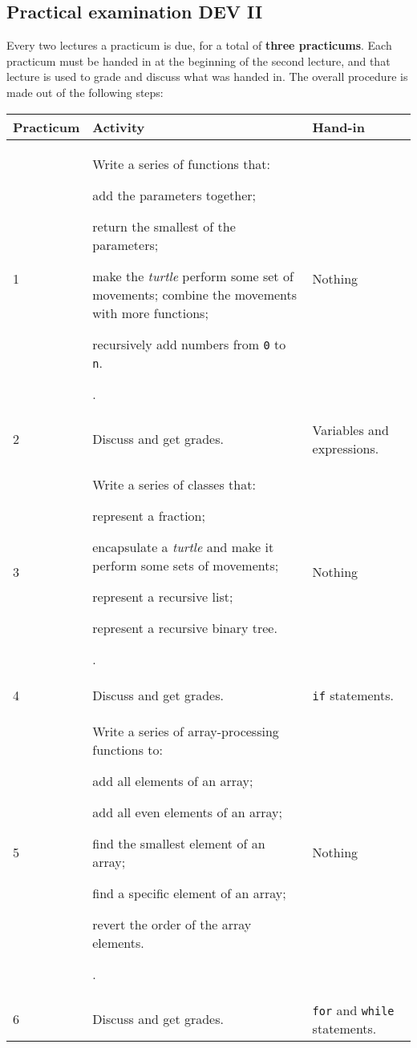 \subsection{Practical examination DEV II}
Every two lectures a practicum is due, for a total of \textbf{three practicums}. Each practicum must be handed in at the beginning of the second lecture, and that lecture is used to grade and discuss what was handed in. The overall procedure is made out of the following steps:

\begin{tabular}{| l | p{8cm} | p{4cm} |}
\hline
\textbf{Practicum} & \textbf{Activity} & \textbf{Hand-in} \\
\hline
1 & Write a series of functions that: 
\begin{inparaenum}
\item add the parameters together;
\item return the smallest of the parameters;
\item make the \textit{turtle} perform some set of movements; combine the movements with more functions;
\item recursively add numbers from \texttt{0} to \texttt{n}.
\end{inparaenum}. & Nothing \\
\hline
2 & Discuss and get grades. & Variables and expressions. \\
\hline
3 & Write a series of classes that:
\begin{inparaenum}
\item represent a fraction;
\item encapsulate a \textit{turtle} and make it perform some sets of movements;
\item represent a recursive list;
\item represent a recursive binary tree.
\end{inparaenum}. & Nothing \\
\hline
4 & Discuss and get grades. & \texttt{if} statements. \\
\hline
5 & Write a series of array-processing functions to:
\begin{inparaenum}
\item add all elements of an array;
\item add all even elements of an array;
\item find the smallest element of an array;
\item find a specific element of an array;
\item revert the order of the array elements.
\end{inparaenum}. & Nothing \\
\hline
6 & Discuss and get grades. & \texttt{for} and \texttt{while} statements. \\
\hline

\end{tabular}

\ \\


